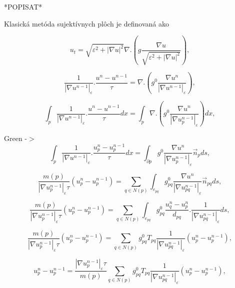 \documentclass[a4paper,11pt,twoside]{article}%
\def\epsilon{\varepsilon}
\begin{document}
*POPISAT*

Klasická metóda sujektívnych plôch je definovaná ako

\begin{equation}
u_t = \sqrt{\epsilon^2 + |\nabla u|^2}\nabla.(g \frac{\nabla u}{\sqrt{\epsilon^2 + |\nabla u|^2}}),
\end{equation}



\begin{equation}
\frac{1}{|\nabla u^{n-1}|_{\epsilon}}.\frac{u^n-u^{n-1}}{\tau} = \nabla.(g^0\frac{\nabla u^n}{|\nabla u^{n-1}|_{\epsilon}}),
\end{equation}

\begin{equation}
\int_{p}\frac{1}{|\nabla u^{n-1}|_{\epsilon}}.\frac{u^n-u^{n-1}}{\tau}dx = \int_{p}\nabla.(g^0\frac{\nabla u^n}{|\nabla u_p^{n-1}|_{\epsilon}})dx,
\end{equation}

Green -$>$
\begin{equation}
\int_{p}\frac{1}{|\nabla u^{n-1}|_{\epsilon}}.\frac{u_p^n-u_p^{n-1}}{\tau}dx = \int_{\partial p} g^0\frac{\nabla u^n}{|\nabla u_p^{n-1}|_{\epsilon}}\vec{n}_pds,
\end{equation}

\begin{equation}
\frac{m(p)}{|\nabla u_p^{n-1}|_{\epsilon}\tau}(u_p^n-u_p^{n-1}) = \sum_{q \in N(p)}\int_{e_{pq}}g_{pq}^0\frac{\nabla u^n}{|\nabla u_{pq}^{n-1}|_{\epsilon}}\vec{n}_{pq}ds,
\end{equation}

\begin{equation}
\frac{m(p)}{|\nabla u_p^{n-1}|_{\epsilon}\tau}(u_p^n-u_p^{n-1}) = \sum_{q \in N(p)}\int_{e_{pq}}g_{pq}^0\frac{u_q^n - u_p^n}{d_{pq}}.\frac{1}{|\nabla u_{pq}^{n-1}|_{\epsilon}}ds,
\end{equation}

\begin{equation}
\frac{m(p)}{|\nabla u_p^{n-1}|_{\epsilon}\tau}(u_p^n-u_p^{n-1}) = \sum_{q \in N(p)}
g_{pq}^0T_{pq}\frac{1}{|\nabla u_{pq}^{n-1}|_{\epsilon}}(u_p^n-u_p^{n-1}),
\end{equation}

\begin{equation}
u_p^n-u_p^{n-1} =\frac{|\nabla u_p^{n-1}|_{\epsilon}\tau}{m(p)} \sum_{q \in N(p)}
g_{pq}^0T_{pq}\frac{1}{|\nabla u_{pq}^{n-1}|_{\epsilon}}(u_p^n-u_p^{n-1}),
\end{equation}
\end{document}

